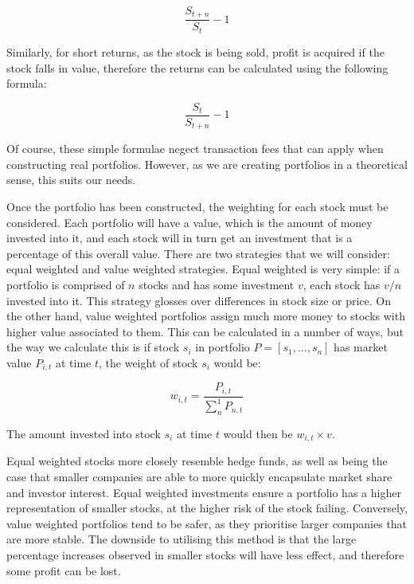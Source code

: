 \begin{equation}
\frac{S_{t+n}}{S_{t}} - 1
\end{equation}

\noindent
Similarly, for short returns, as the stock is being sold, profit is acquired if the stock falls in value, therefore the returns can be calculated using the following formula:

\begin{equation}
\frac{S_{t}}{S_{t+n}} - 1
\end{equation}

\noindent
Of course, these simple formulae negect transaction fees that can apply when constructing real portfolios. However, as we are creating portfolios in a theoretical sense, this suits our needs.

Once the portfolio has been constructed, the weighting for each stock must be considered. Each portfolio will have a value, which is the amount of money invested into it, and each stock will in turn get an investment that is a percentage of this overall value. There are two strategies that we will consider: equal weighted and value weighted strategies. Equal weighted is very simple: if a portfolio is comprised of $n$ stocks and has some investment $v$, each stock has $v/n$ invested into it. This strategy glosses over differences in stock size or price. On the other hand, value weighted portfolios assign much more money to stocks with higher value associated to them. This can be calculated in a number of ways, but the way we calculate this is if stock $s_i$ in portfolio $P = [s_1, ..., s_n]$ has market value $P_{i,t}$ at time $t$, the weight of stock $s_i$ would be:

\begin{equation}
w_{i,t} = \frac{P_{i,t}}{\sum_{n}^1 P_{n,t}}
\end{equation}

\noindent
The amount invested into stock $s_i$ at time $t$ would then be $w_{i,t} \times v$.

Equal weighted stocks more closely resemble hedge funds, as well as being the case that smaller companies are able to more quickly encapsulate market share and investor interest. Equal weighted investments ensure a portfolio has a higher representation of smaller stocks, at the higher risk of the stock failing. Conversely, value weighted portfolios tend to be safer, as they prioritise larger companies that are more stable. The downside to utilising this method is that the large percentage increases observed in smaller stocks will have less effect, and therefore some profit can be lost.


